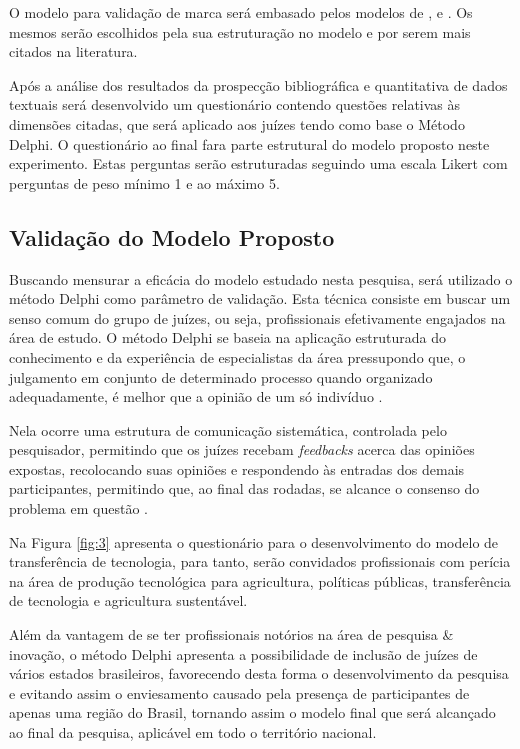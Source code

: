 O modelo para validação de marca será embasado pelos modelos de ,  e . Os mesmos serão escolhidos pela sua estruturação no modelo e por serem mais citados na literatura.


Após a análise dos resultados da prospecção bibliográfica e  quantitativa de dados textuais será desenvolvido um questionário contendo questões relativas às dimensões citadas, que será aplicado aos juízes tendo como base o Método Delphi. O questionário ao final fara parte estrutural do modelo proposto neste experimento. Estas perguntas serão estruturadas seguindo uma escala Likert com perguntas de peso mínimo 1 e ao máximo 5.

\subsection{Validação do Modelo Proposto}

Buscando mensurar a eficácia do modelo estudado nesta pesquisa, será utilizado o método Delphi como parâmetro de validação. Esta técnica consiste em buscar um senso comum do grupo de juízes, ou seja, profissionais efetivamente engajados na área de estudo. O método Delphi se baseia na aplicação estruturada do conhecimento e da experiência de especialistas da área pressupondo que, o julgamento em conjunto de determinado processo quando organizado adequadamente, é melhor que a opinião de um só indivíduo \cite{Faro1997}.

Nela  ocorre uma estrutura de comunicação sistemática, controlada pelo pesquisador, permitindo que os juízes recebam \textit{feedbacks} acerca das opiniões expostas, recolocando suas opiniões e respondendo às entradas dos demais participantes, permitindo que, ao final das rodadas, se alcance o consenso do problema em questão \cite{Massaroli2017}.

Na Figura \ref{fig:3} apresenta o questionário para o desenvolvimento do modelo de transferência de tecnologia, para tanto, serão convidados profissionais com perícia na área de produção tecnológica para agricultura, políticas públicas, transferência de tecnologia e agricultura sustentável.

Além da vantagem de se ter profissionais notórios na área de pesquisa & inovação, o método Delphi apresenta a  possibilidade de inclusão de juízes de vários estados brasileiros, favorecendo desta forma o desenvolvimento da pesquisa e evitando assim o enviesamento causado pela presença de participantes de apenas uma região do Brasil, tornando assim o modelo final que será alcançado ao final da pesquisa, aplicável em todo o território nacional.


